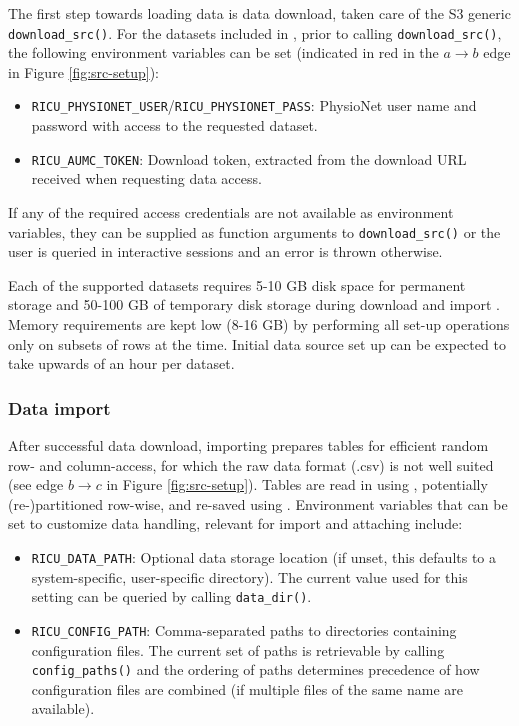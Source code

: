 \documentclass[
  notitle]{jss}
\providecommand{\tightlist}{%
  \setlength{\itemsep}{0pt}\setlength{\parskip}{0pt}}
\begin{document}
The first step towards loading data is data download, taken care of the
S3 generic \texttt{download\_src()}. For the datasets included in
, prior to calling \texttt{download\_src()}, the following
environment variables can be set (indicated in red in the \(a \to b\)
edge in Figure \ref{fig:src-setup}):

\begin{itemize}
\tightlist
\item
  \texttt{RICU\_PHYSIONET\_USER}/\texttt{RICU\_PHYSIONET\_PASS}:
  PhysioNet user name and password with access to the requested dataset.
\item
  \texttt{RICU\_AUMC\_TOKEN}: Download token, extracted from the
  download URL received when requesting data access.
\end{itemize}

If any of the required access credentials are not available as
environment variables, they can be supplied as function arguments to
\texttt{download\_src()} or the user is queried in interactive sessions
and an error is thrown otherwise.

Each of the supported datasets requires 5-10 GB disk space for permanent
storage and 50-100 GB of temporary disk storage during download and
import . Memory requirements are kept low (8-16 GB) by performing all
set-up operations only on subsets of rows at the time. Initial data
source set up can be expected to take upwards of an hour per dataset.

\hypertarget{data-import}{%
\subsubsection{Data import}\label{data-import}}

After successful data download, importing prepares tables for efficient
random row- and column-access, for which the raw data format (.csv) is
not well suited (see edge \(b \to c\) in Figure \ref{fig:src-setup}).
Tables are read in using  \citep{hester2020}, potentially
(re-)partitioned row-wise, and re-saved using . Environment
variables that can be set to customize  data handling,
relevant for import and attaching include:

\begin{itemize}
\tightlist
\item
  \texttt{RICU\_DATA\_PATH}: Optional data storage location (if unset,
  this defaults to a system-specific, user-specific directory). The
  current value used for this setting can be queried by calling
  \texttt{data\_dir()}.
\item
  \texttt{RICU\_CONFIG\_PATH}: Comma-separated paths to directories
  containing configuration files. The current set of paths is
  retrievable by calling \texttt{config\_paths()} and the ordering of
  paths determines precedence of how configuration files are combined
  (if multiple files of the same name are available).
\end{itemize}
\end{document}
